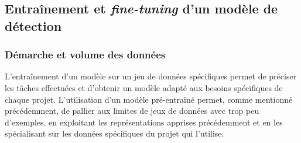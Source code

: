    	
    \subsection{Entraînement et \textit{fine-tuning} d'un modèle de détection}
        \subsubsection{Démarche et volume des données}
		L'entraînement d'un modèle sur un jeu de données spécifiques permet de préciser les tâches effectuées et d'obtenir un modèle adapté aux besoins spécifiques de chaque projet. L'utilisation d'un modèle pré-entraîné permet, comme mentionné précédemment, de pallier aux limites de jeux de données avec trop peu d'exemples, en exploitant les représentations apprises précédemment et en les spécialisant sur les données spécifiques du projet qui l'utilise.
		
